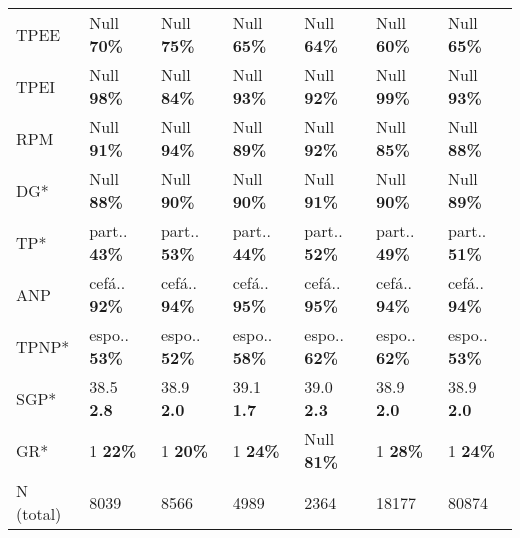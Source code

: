 \begin{tabular}{l|llllll}
     TPEE &   Null \textbf{70\%} &   Null \textbf{75\%} &   Null \textbf{65\%} &   Null \textbf{64\%} &   Null \textbf{60\%} &   Null \textbf{65\%} \\
     TPEI &   Null \textbf{98\%} &   Null \textbf{84\%} &   Null \textbf{93\%} &   Null \textbf{92\%} &   Null \textbf{99\%} &   Null \textbf{93\%} \\
      RPM &   Null \textbf{91\%} &   Null \textbf{94\%} &   Null \textbf{89\%} &   Null \textbf{92\%} &   Null \textbf{85\%} &   Null \textbf{88\%} \\
       DG* &   Null \textbf{88\%} &   Null \textbf{90\%} &   Null \textbf{90\%} &   Null \textbf{91\%} &   Null \textbf{90\%} &   Null \textbf{89\%} \\
       TP* & part.. \textbf{43\%} & part.. \textbf{53\%} & part.. \textbf{44\%} & part.. \textbf{52\%} & part.. \textbf{49\%} & part.. \textbf{51\%} \\
      ANP & cefá.. \textbf{92\%} & cefá.. \textbf{94\%} & cefá.. \textbf{95\%} & cefá.. \textbf{95\%} & cefá.. \textbf{94\%} & cefá.. \textbf{94\%} \\
     TPNP* & espo.. \textbf{53\%} & espo.. \textbf{52\%} & espo.. \textbf{58\%} & espo.. \textbf{62\%} & espo.. \textbf{62\%} & espo.. \textbf{53\%} \\
      SGP* &    38.5 \textbf{2.8} &    38.9 \textbf{2.0} &    39.1 \textbf{1.7} &    39.0 \textbf{2.3} &    38.9 \textbf{2.0} &    38.9 \textbf{2.0} \\
       GR* &      1 \textbf{22\%} &      1 \textbf{20\%} &      1 \textbf{24\%} &   Null \textbf{81\%} &      1 \textbf{28\%} &      1 \textbf{24\%} \\
       \midrule
N (total) &                 8039 &                 8566 &                 4989 &                 2364 &                18177 &                80874 \\
\bottomrule
\end{tabular}
